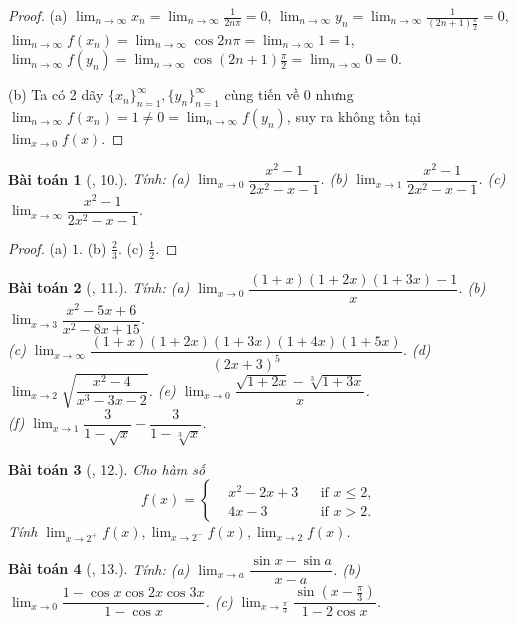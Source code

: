 \documentclass[oneside]{book}
\newtheorem{baitoan}{Bài toán}
\begin{document}
\begin{proof}
	(a) $\lim_{n\to\infty} x_n = \lim_{n\to\infty} \frac{1}{2n\pi} = 0$, $\lim_{n\to\infty} y_n = \lim_{n\to\infty} \frac{1}{(2n + 1)\frac{\pi}{2}} = 0$, $\lim_{n\to\infty} f(x_n) = \lim_{n\to\infty} \cos2n\pi = \lim_{n\to\infty} 1 = 1$, $\lim_{n\to\infty} f(y_n) = \lim_{n\to\infty} \cos(2n + 1)\frac{\pi}{2} = \lim_{n\to\infty} 0 = 0$.
	
	\item(b) Ta có 2 dãy $\{x_n\}_{n=1}^\infty,\{y_n\}_{n=1}^\infty$ cùng tiến về 0 nhưng $\lim_{n\to\infty} f(x_n) = 1\ne0 = \lim_{n\to\infty} f(y_n)$, suy ra không tồn tại $\lim_{x\to0} f(x)$.
\end{proof}

\begin{baitoan}[\cite{TLCT_dai_so_giai_tich_11}, 10.]
	Tính: (a) $\lim_{x\to0} \dfrac{x^2 - 1}{2x^2 - x - 1}$. (b) $\lim_{x\to1} \dfrac{x^2 - 1}{2x^2 - x - 1}$. (c) $\lim_{x\to\infty} \dfrac{x^2 - 1}{2x^2 - x - 1}$.
\end{baitoan}

\begin{proof}
	(a) $1$. (b) $\frac{2}{3}$. (c) $\frac{1}{2}$.
\end{proof}

\begin{baitoan}[\cite{TLCT_dai_so_giai_tich_11}, 11.]
	Tính: (a) $\lim_{x\to0} \dfrac{(1 + x)(1 + 2x)(1 + 3x) - 1}{x}$. (b) $\lim_{x\to3} \dfrac{x^2 - 5x + 6}{x^2 - 8x + 15}$.\\(c) $\lim_{x\to\infty} \dfrac{(1 + x)(1 + 2x)(1 + 3x)(1 + 4x)(1 + 5x)}{(2x + 3)^5}$. (d) $\lim_{x\to2} \sqrt{\dfrac{x^2 - 4}{x^3 - 3x - 2}}$. (e) $\lim_{x\to0} \dfrac{\sqrt{1 + 2x} - \sqrt[3]{1 + 3x}}{x}$.\\(f) $\lim_{x\to1} \dfrac{3}{1 - \sqrt{x}} - \dfrac{3}{1 - \sqrt[3]{x}}$.
\end{baitoan}

\begin{baitoan}[\cite{TLCT_dai_so_giai_tich_11}, 12.]
	Cho hàm số
	\begin{equation*}
		f(x) = \left\{\begin{split}
			&x^2 - 2x + 3&&\mbox{if } x\le2,\\
			&4x - 3&&\mbox{if } x > 2.
		\end{split}\right.
	\end{equation*}
	Tính $\lim_{x\to2^+} f(x),\lim_{x\to2^-} f(x),\lim_{x\to2} f(x)$.
\end{baitoan}

\begin{baitoan}[\cite{TLCT_dai_so_giai_tich_11}, 13.]
	Tính: (a) $\lim_{x\to a} \dfrac{\sin x - \sin a}{x - a}$. (b) $\lim_{x\to0} \dfrac{1 - \cos x\cos2x\cos3x}{1 - \cos x}$. (c) $\lim_{x\to\frac{\pi}{3}} \dfrac{\sin\left(x - \frac{\pi}{3}\right)}{1 - 2\cos x}$.
\end{baitoan}
\end{document}
